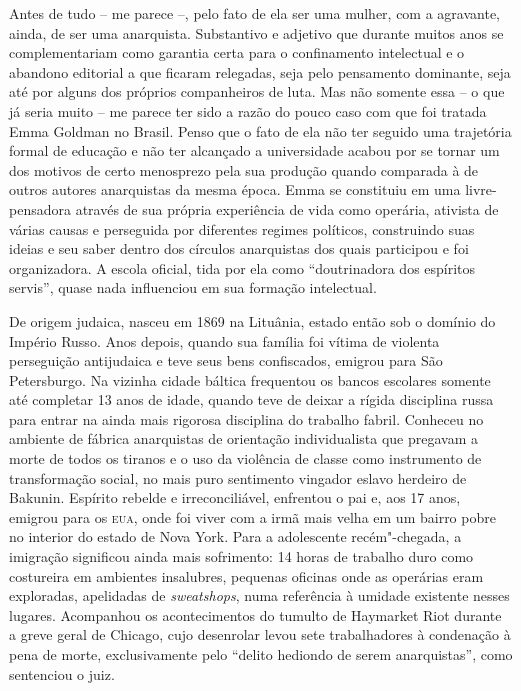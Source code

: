 Antes de tudo – me parece –, pelo fato de ela ser uma mulher, com a
agravante, ainda, de ser uma anarquista. Substantivo e adjetivo que
durante muitos anos se complementariam como garantia certa para o
confinamento intelectual e o abandono editorial a que ficaram
relegadas, seja pelo pensamento dominante, seja até por alguns dos
próprios companheiros de luta. Mas não somente essa – o que já seria
muito – me parece ter sido a razão do pouco caso com que foi tratada Emma
Goldman no Brasil. Penso que o fato de ela não ter seguido uma
trajetória formal de educação e não ter alcançado a universidade
acabou por se tornar um dos motivos de certo menosprezo pela sua
produção quando comparada à de outros autores anarquistas da mesma
época. Emma se constituiu em uma livre-pensadora através de sua própria
experiência de vida como operária, ativista de várias causas e
perseguida por diferentes regimes políticos, construindo suas ideias e
seu saber dentro dos círculos anarquistas dos quais participou e
foi organizadora. A escola oficial, tida por ela como “doutrinadora dos
espíritos servis”, quase nada influenciou em sua formação intelectual.

De origem judaica, nasceu em 1869 na Lituânia, estado então sob o
domínio do Império Russo. Anos depois, quando sua família foi vítima de
violenta perseguição antijudaica e teve seus bens confiscados, emigrou
para São Petersburgo. Na vizinha cidade báltica frequentou os bancos
escolares somente até completar 13 anos de idade, quando teve de
deixar a rígida disciplina russa para entrar na ainda mais rigorosa
disciplina do trabalho fabril. Conheceu no ambiente de fábrica
anarquistas de orientação individualista que pregavam a morte de todos
os tiranos e o uso da violência de classe como instrumento de
transformação social, no mais puro sentimento vingador eslavo herdeiro
de Bakunin. Espírito rebelde e irreconciliável, enfrentou o pai e, aos 
17 anos, emigrou para os \textsc{eua}, onde foi viver com a irmã mais
velha em um bairro pobre no interior do estado de Nova York. Para a
adolescente recém"-chegada, a imigração significou ainda mais
sofrimento: 14 horas de trabalho duro como costureira em ambientes
insalubres, pequenas oficinas onde as operárias eram exploradas,
apelidadas de \textit{sweatshops}, numa referência à umidade existente nesses
lugares. Acompanhou os acontecimentos do tumulto de Haymarket Riot
durante a greve geral de Chicago, cujo desenrolar levou sete
trabalhadores à condenação à pena de morte, exclusivamente pelo
“delito hediondo de serem anarquistas”, como sentenciou o juiz. 


